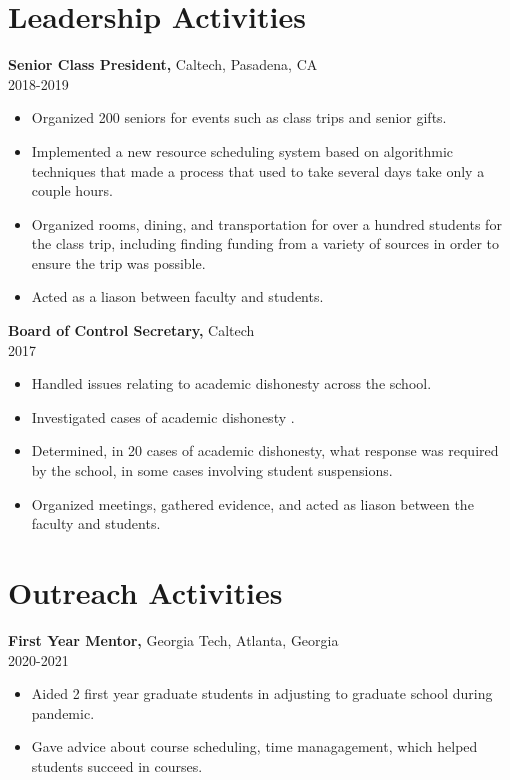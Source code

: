 \documentclass[margin]{res}
\begin{document}
\begin{resume}
\section{Leadership   Activities} 
       {\bf Senior Class President,} Caltech, Pasadena, CA    \\         2018-2019 
        \begin{itemize} \itemsep -2pt
          \item Organized 200 seniors for events such as class trips and senior gifts.
          \item Implemented a new resource scheduling system based on algorithmic techniques that made a process that used to take several days take only a couple hours.
          \item Organized rooms, dining, and transportation for over a hundred students for the class trip, including finding funding from a variety of sources in order to ensure the trip was possible.
          \item Acted as a liason between faculty and students.
		 \end{itemize}

		{\bf Board of Control Secretary,} Caltech \\   2017
        \begin{itemize} \itemsep -2pt
             \item Handled issues relating to academic dishonesty across the school.
             \item Investigated cases of academic dishonesty .
             \item Determined, in 20 cases of academic dishonesty, what response was required by the school, in some cases involving student suspensions.
             \item Organized meetings, gathered evidence, and acted as liason between the faculty and students.
		 \end{itemize}

\section{Outreach   Activities} 
       {\bf First Year Mentor,} Georgia Tech, Atlanta, Georgia     \\         2020-2021 
        \begin{itemize} \itemsep -2pt
            \item Aided 2 first year graduate students in adjusting to graduate school during pandemic.
          \item Gave advice about course scheduling, time managagement, which helped students succeed in courses.
		 \end{itemize}


\end{resume}
\end{document}
